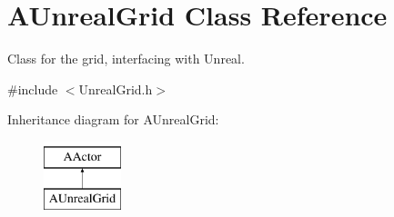 \hypertarget{class_a_unreal_grid}{}\section{A\+Unreal\+Grid Class Reference}
\label{class_a_unreal_grid}


Class for the grid, interfacing with Unreal.  




{\ttfamily \#include $<$Unreal\+Grid.\+h$>$}

Inheritance diagram for A\+Unreal\+Grid\+:\begin{figure}[H]
\begin{center}
\leavevmode
\includegraphics[height=2.000000cm]{class_a_unreal_grid}
\end{center}
\end{figure}
